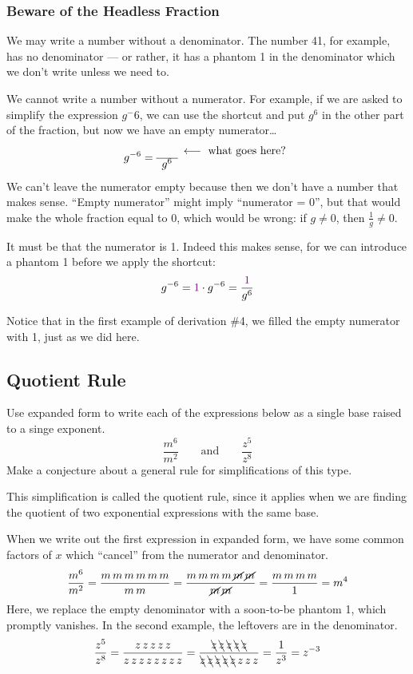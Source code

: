 \subsubsection{Beware of the Headless Fraction}

We may write a number without a denominator. The number 41, for example, has no denominator --- or rather, it has a phantom 1 in the denominator which we don't write unless we need to.

We cannot write a number without a numerator. For example, if we are asked to simplify the expression $g^-6$, we can use the shortcut and put $g^6$ in the other part of the fraction, but now we have an empty numerator\ldots \[g^{-6} = 
\begin{array}{cc}~~&\longleftarrow\text{ what goes here?}
\\\cline{1-1}
g^6 & ~~\end{array}\]
We can't leave the numerator empty because then we don't have a number that makes sense. ``Empty numerator'' might imply ``numerator = 0'', but that would make the whole fraction equal to 0, which would be wrong: if $g\neq0$, then $\frac{1}{g} \neq 0$.

It must be that the numerator is 1. Indeed this makes sense, for we can introduce a phantom 1 before we apply the shortcut:
\[g^{-6} = {\color{violet}1} \cdot g^{-6} = \frac{{\color{violet}1}}{g^6}\]

Notice that in the first example of derivation \#4, we filled the empty numerator with 1, just as we did here.


\subsection{Quotient Rule}

\begin{boxedexplore}
Use expanded form to write each of the expressions below as a single base raised to a singe exponent.
\[\frac{m^6}{m^2} \qquad\text{and}\qquad \frac{z^5}{z^8}\]
Make a conjecture about a general rule for simplifications of this type.
\end{boxedexplore}

This simplification is called the quotient rule, since it applies when we are finding the quotient of two exponential expressions with the same base.

When we write out the first expression in expanded form, we have some common factors of $x$ which ``cancel'' from the numerator and denominator.
\[\frac{m^6}{m^2} = \frac{m\,m\,m\,m\,m\,m}{m\,m} = \frac{m\,m\,m\,m\,\cancel{m}\,\cancel{m}}{\cancel{m}\,\cancel{m}} = \frac{m\,m\,m\,m}{1} = m^4\]
Here, we replace the empty denominator with a soon-to-be phantom 1, which promptly vanishes. In the second example, the leftovers are in the denominator.
\[\frac{z^5}{z^8} = \frac{z\,z\,z\,z\,z}{z\,z\,z\,z\,z\,z\,z\,z} = \frac{\bcancel{z}\,\bcancel{z}\,\bcancel{z}\,\bcancel{z}\,\bcancel{z}}{\bcancel{z}\,\bcancel{z}\,\bcancel{z}\,\bcancel{z}\,\bcancel{z}\,z\,z\,z} = \frac{1}{z^3} = z^{-3}\]

